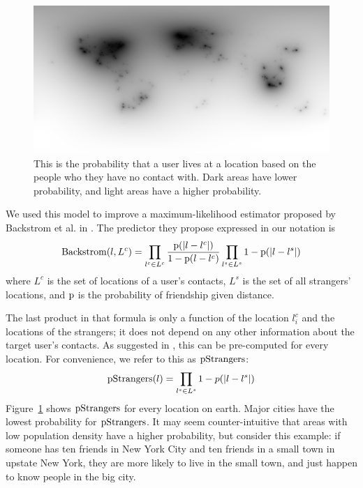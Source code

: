 \begin{figure}[tbh]
\centering
\includegraphics[width=\linewidth]{figures/stranger_mat.png}
\caption{
    This is the probability that a user lives at a location based on the people
    who they have no contact with. Dark areas have lower probability, and light
    areas have a higher probability.
%
}
\label{fig:StrangerMat}
\end{figure}


We used this model to improve a maximum-likelihood estimator proposed by
Backstrom et al. in \cite{backstrom2010find}.
%
The predictor they propose expressed in our notation is
\[
    \operatorname{Backstrom}(l,L^c) = 
        \prod_{l^c \in L^c} {\operatorname{p}(|l-l^c|) \over 1-\operatorname{p}(l-l^c) }
        \prod_{l^s \in L^s} 1-\operatorname{p}(|l-l^s|)
\]
where $L^c$ is the set of locations of a user's contacts, $L^s$ is the set
of all strangers' locations, and $\operatorname{p}$ is the probability of friendship given
distance.

The last product in that formula is only a function of the location $l^c_i$ and
the locations of the strangers; it does not depend on any other information
about the target user's contacts.
%
As suggested in \cite{backstrom2010find}, this can be pre-computed for every
location.
%
For convenience, we refer to this as $\operatorname{pStrangers}$:
\[
    \operatorname{pStrangers}(l) = \prod_{l^s \in L^s}1-p(|l-l^s|)
\]
Figure~\ref{fig:StrangerMat} shows $\operatorname{pStrangers}$ for every location on earth.
%
Major cities have the lowest probability for $\operatorname{pStrangers}$.
%
It may seem counter-intuitive that areas with low population density have a
higher probability, but consider this example: if someone has ten friends in
New York City and ten friends in a small town in upstate New York, they are
more likely to live in the small town, and just happen to know people in the
big city.

